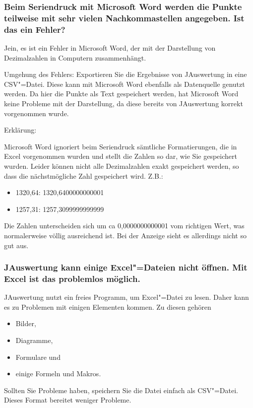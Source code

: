 \documentclass[11pt,a4paper,twoside,ngerman]{article}
\begin{document}
\subsubsection*{Beim Seriendruck mit Microsoft Word werden die Punkte teilweise mit sehr vielen Nachkommastellen angegeben. Ist das ein Fehler?}
Jein, es ist ein Fehler in Microsoft Word, der mit der Darstellung von Dezimalzahlen in Computern zusammenhängt. 

Umgehung des Fehlers: Exportieren Sie die Ergebnisse von JAuswertung in eine CSV"=Datei. Diese kann mit Microsoft Word ebenfalls als Datenquelle genutzt werden. Da hier die Punkte als Text gespeichert werden, hat Microsoft Word keine Probleme mit der Darstellung, da diese bereits von JAuswertung korrekt vorgenommen wurde.

\begin{bfseries}Erklärung:\end{bfseries} Microsoft Word ignoriert beim Seriendruck sämtliche Formatierungen, die in Excel vorgenommen wurden und stellt die Zahlen so dar, wie Sie gespeichert wurden. Leider können nicht alle Dezimalzahlen exakt gespeichert werden, so dass die nächstmögliche Zahl gespeichert wird. Z.B.:


\begin{itemize}

\item 1320,64: 1320,6400000000001


\item 1257,31: 1257,3099999999999


\end{itemize}
Die Zahlen unterscheiden sich um ca 0,0000000000001 vom richtigen Wert, was normalerweise völlig ausreichend ist. Bei der Anzeige sieht es allerdings nicht so gut aus.


\subsubsection*{JAuswertung kann einige Excel"=Dateien nicht öffnen. Mit Excel ist das problemlos möglich.}
JAuswertung nutzt ein freies Programm, um Excel"=Datei zu lesen. Daher kann es zu Problemen mit einigen Elementen kommen. Zu diesen gehören


\begin{itemize}

\item Bilder,


\item Diagramme,


\item Formulare und


\item einige Formeln und Makros.


\end{itemize}
Sollten Sie Probleme haben, speichern Sie die Datei einfach als CSV"=Datei. Dieses Format bereitet weniger Probleme.
\end{document}
